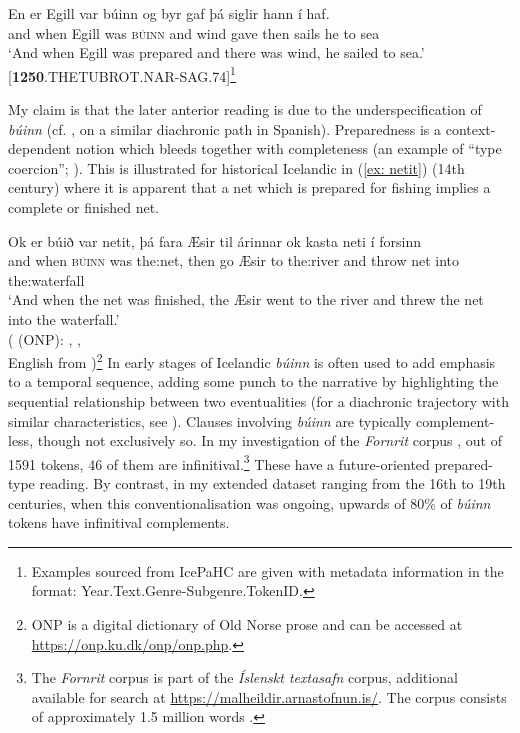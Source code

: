 \documentclass[output=paper,colorlinks,citecolor=brown]{langscibook}
\begin{document}
\ea\label{ex: 1250} \gll En er Egill var búinn og byr gaf þá siglir hann í haf.\\
and when Egill was \textsc{búinn} and wind gave then sails he to sea\\
\glt  `And when Egill was prepared and there was wind, he sailed to sea.'\\
 \hfill [\textbf{1250}.THETUBROT.NAR-SAG.74]\footnote{Examples sourced from IcePaHC are given with metadata information in the format: Year.Text.Genre-Subgenre.TokenID.}
\z

My claim is that the later anterior reading is due to the underspecification of \textit{búinn} (cf. \citeauthor{rosemeyer2017road}, \citeyear{rosemeyer2017road} on a similar diachronic path in Spanish). Preparedness is a context-dependent notion which bleeds together with completeness (an example of ``type coercion''; \cite{pustejovsky1998generative}). This is illustrated for historical Icelandic in (\ref{ex: netit}) (14th century) where it is apparent that a net which is prepared for fishing implies a complete or finished net.

\ea\label{ex: netit} 
\gll Ok er búið var netit, þá fara Æsir til árinnar ok kasta neti í forsinn\\
and when \textsc{búinn} was the:net, then go Æsir to the:river and throw net into the:waterfall\\
\glt `And when the net was finished, the Æsir went to the river and threw the net into the waterfall.' \\
\hfill (\citeauthor{onp} (ONP): \citeauthor{jonsson1931edda}, \citeyear[69]{jonsson1931edda}, \\
\hfill English from \citeauthor{faulkes1987snorri} \citeyear{faulkes1987snorri})\footnote{ONP \citep{onp} is a digital dictionary of Old Norse prose and can be accessed at \url{https://onp.ku.dk/onp/onp.php}.}
\z
\largerpage[-1]
In early stages of Icelandic \textit{búinn} is often used to add emphasis to a temporal sequence, adding some punch to the narrative by highlighting the sequential relationship between two eventualities (for a diachronic trajectory with similar characteristics, see \cite{rosemeyer2017road}). Clauses involving \textit{búinn} are typically complement-less, though not exclusively so. In my investigation of the \textit{Fornrit} corpus \citep{IslensktTextasafn2019}, out of 1591 tokens, 46 of them are infinitival.\footnote{The \textit{Fornrit} corpus is part of the \textit{Íslenskt textasafn} corpus, additional available for search at \url{https://malheildir.arnastofnun.is/}. The corpus consists of approximately 1.5 million words \citep{IslensktTextasafn2019, rognvaldsson2011morphosyntactic}.} These have a future-oriented prepared-type reading.  By contrast, in my extended dataset ranging from the 16th to 19th centuries, when this conventionalisation was ongoing, upwards of 80\% of \textit{búinn} tokens have infinitival complements. 
\end{document}
